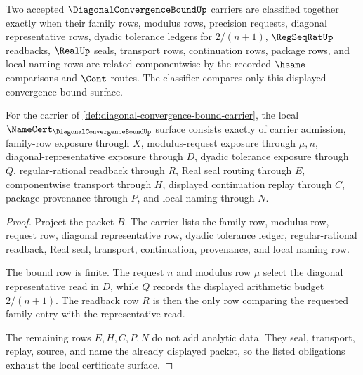 \begin{definition}
\label{def:diagonal-convergence-bound-classifier}
Two accepted $\DiagonalConvergenceBoundUp$ carriers are classified together exactly when their family rows, modulus rows, precision requests, diagonal representative rows, dyadic tolerance ledgers for $2/(n+1)$, $\RegSeqRatUp$ readbacks, $\RealUp$ seals, transport rows, continuation rows, package rows, and local naming rows are related componentwise by the recorded $\hsame$ comparisons and $\Cont$ routes. The classifier compares only this displayed convergence-bound surface.
\end{definition}

\begin{theorem}
\label{thm:diagonal-convergence-bound-namecert-obligations}
For the carrier of \autoref{def:diagonal-convergence-bound-carrier}, the local $\NameCert_{\DiagonalConvergenceBoundUp}$ surface consists exactly of carrier admission, family-row exposure through $X$, modulus-request exposure through $\mu,n$, diagonal-representative exposure through $D$, dyadic tolerance exposure through $Q$, regular-rational readback through $R$, Real seal routing through $E$, componentwise transport through $H$, displayed continuation replay through $C$, package provenance through $P$, and local naming through $N$.
\end{theorem}
\begin{proof}
Project the packet $B$. The carrier lists the family row, modulus row, request row, diagonal representative row, dyadic tolerance ledger, regular-rational readback, Real seal, transport, continuation, provenance, and local naming row.

The bound row is finite. The request $n$ and modulus row $\mu$ select the diagonal representative read in $D$, while $Q$ records the displayed arithmetic budget $2/(n+1)$. The readback row $R$ is then the only row comparing the requested family entry with the representative read.

The remaining rows $E,H,C,P,N$ do not add analytic data. They seal, transport, replay, source, and name the already displayed packet, so the listed obligations exhaust the local certificate surface.
\end{proof}

